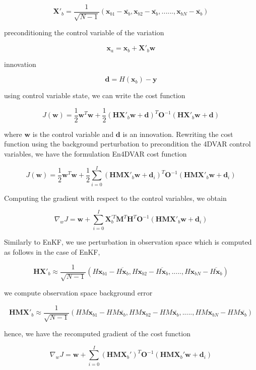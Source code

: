 \documentclass[a4,12pt]{article}
\numberwithin{equation}{section}
\begin{document}
$$\textbf{X}'_{b}=\frac{1}{\sqrt{N-1}}(\textbf{x}_{b1}-\overline{\textbf{x}_{b}},\textbf{x}_{b2}-\overline{\textbf{x}_{b}},......,\textbf{x}_{bN}-\overline{\textbf{x}_{b}})$$

preconditioning the control variable of the variation

$$\textbf{x}_{a} = \textbf{x}_{b} + \textbf{X}'_{b}\textbf{w}$$

innovation

$$\textbf{d} = H(\textbf{x}_{b})-\textbf{y}$$

using control variable state, we can write the cost function

$$J(\textbf{w}) = \frac{1}{2} \textbf{w}^{T}\textbf{w} + \frac{1}{2}(\textbf{H}\textbf{X}'_{b}\textbf{w}+\textbf{d})^{T}\textbf{O}^{-1}(\textbf{H}\textbf{X}'_{b}\textbf{w}+\textbf{d})$$

where $\textbf{w}$ is the control variable and $\textbf{d}$ is an innovation. Rewriting the cost function using the background perturbation to precondition the 4DVAR control variables, we have the formulation En4DVAR cost function

$$J(\textbf{w}) = \frac{1}{2} \textbf{w}^{T}\textbf{w} + \frac{1}{2}\sum_{i=0}^{I}(\textbf{HM}\textbf{X}'_{b}\textbf{w} + \textbf{d}_{i})^{T}\textbf{O}^{-1}(\textbf{HMX}'_{b}\textbf{w}+\textbf{d}_{i})$$

Computing the gradient with respect to the control variables, we obtain

$$\nabla_{w}J = \textbf{w} + \sum_{i=0}^{I} \textbf{X}_{b}^{'T}\textbf{M}^{T}\textbf{H}^{T}\textbf{O}^{-1}(\textbf{HMX}'_{b}\textbf{w}+\textbf{d}_{i})$$

Similarly to EnKF, we use perturbation in observation space which is computed as follows in the case of EnKF,

$$\textbf{HX}'_{b} \approx \frac{1}{\sqrt{N-1}}(H\textbf{x}_{b1}-\overline{H\textbf{x}_{b}},H\textbf{x}_{b2}-\overline{H\textbf{x}_{b}},.....,H\textbf{x}_{bN}-\overline{H\textbf{x}_{b}})$$

we compute observation space background error

$$\textbf{HMX}'_{b} \approx \frac{1}{\sqrt{N-1}}(HM\textbf{x}_{b1}-HM\overline{\textbf{x}_{b}}, HM\textbf{x}_{b2}-HM\overline{\textbf{x}_{b}},.....,HM\textbf{x}_{bN}-HM\overline{\textbf{x}_{b}} )$$

hence, we have the recomputed gradient of the cost function

$$\nabla _{w}J = \textbf{w} + \sum_{i=0}^{I}(\textbf{HMX}_{b}')^{T}\textbf{O}^{-1}(\textbf{HMX}_{b}'\textbf{w}+\textbf{d}_{i})$$
\end{document}
